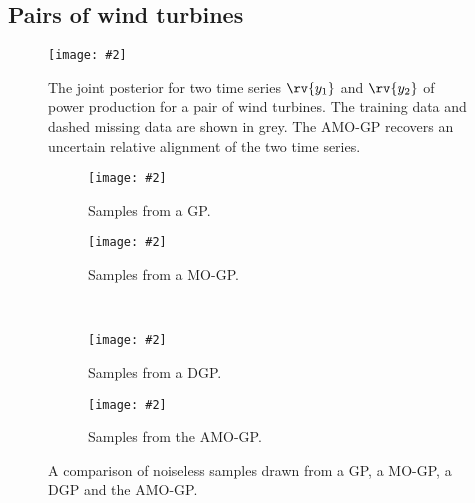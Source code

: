 \documentclass{article}
\newcommand{\includestandalonewithpath}[2][]{%
    \texttt{[image: \#2]}
}
\begin{document}
\subsection{Pairs of wind turbines}
\label{subsec:wind_example}
\begin{figure}[t]
    \centering
    \includestandalonewithpath{figures/wind_joint_model}
    \caption{
        \label{fig:wind_joint_model}
        The joint posterior for two time series $\rv{y_1}$ and $\rv{y_2}$ of power production for a pair of wind turbines.
        The training data and dashed missing data are shown in grey.
        The AMO-GP recovers an uncertain relative alignment of the two time series.
    }
\end{figure}
\begin{figure}[t]
    \centering
    \begin{subfigure}{.475\linewidth}
        \centering
        \includestandalonewithpath{figures/wind_shallow_gp_samples_left}
        \caption{
            \label{fig:wind_samples:a}
            Samples from a GP.
        }
    \end{subfigure}
    \hfill
    \begin{subfigure}{.475\linewidth}
        \centering
        \includestandalonewithpath{figures/wind_mo_gp_samples_left}
        \caption{
            \label{fig:wind_samples:b}
            Samples from a MO-GP.
        }
    \end{subfigure}\\[\baselineskip]
    \begin{subfigure}{.475\linewidth}
        \centering
        \includestandalonewithpath{figures/wind_dgp_samples_left}
        \caption{
            \label{fig:wind_samples:c}
            Samples from a DGP.
        }
    \end{subfigure}
    \hfill
    \begin{subfigure}{.475\linewidth}
        \centering
        \includestandalonewithpath{figures/wind_alignment_samples_left}
        \caption{
            \label{fig:wind_samples:d}
            Samples from the AMO-GP.
        }
    \end{subfigure}
    \caption{
        \label{fig:wind_samples}
        A comparison of noiseless samples drawn from a GP, a MO-GP, a DGP and the AMO-GP.
    }
\end{figure}
\end{document}
